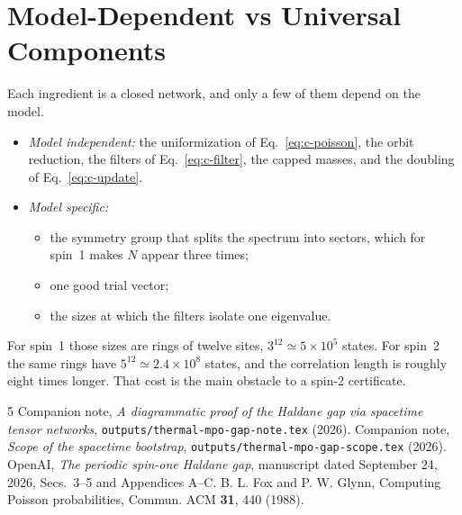 \documentclass[aps,prl,reprint,amsmath,amssymb,nofootinbib,raggedbottom]{revtex4-2}
\begin{document}
\section{Model-Dependent vs Universal Components}\label{app:c-general}
Each ingredient is a closed network, and only a few of them depend on the
model.
\begin{itemize}
\item \emph{Model independent:} the uniformization of Eq.~\eqref{eq:c-poisson},
the orbit reduction, the filters of Eq.~\eqref{eq:c-filter}, the capped
masses, and the doubling of Eq.~\eqref{eq:c-update}.
\item \emph{Model specific:}
 \begin{itemize}
 \item the symmetry group that splits the spectrum into sectors, which
 for spin~1 makes $N$ appear three times;
 \item one good trial vector;
 \item the sizes at which the filters isolate one eigenvalue.
 \end{itemize}
\end{itemize}
For spin~1 those sizes are rings of twelve sites, $3^{12}\simeq5\times10^5$
states. For spin~2 the same rings have $5^{12}\simeq2.4\times10^8$ states,
and the correlation length is roughly eight times longer. That cost is the
main obstacle to a spin-2 certificate.
\begin{thebibliography}{5}
Companion note, \emph{A diagrammatic proof of the Haldane gap via spacetime
tensor networks}, \texttt{outputs/thermal-mpo-gap-note.tex} (2026).
Companion note, \emph{Scope of the spacetime bootstrap},
\texttt{outputs/thermal-mpo-gap-scope.tex} (2026).
OpenAI, \emph{The periodic spin-one Haldane gap}, manuscript dated
September 24, 2026, Secs.~3--5 and Appendices A--C.
B. L. Fox and P. W. Glynn, Computing Poisson probabilities,
Commun. ACM \textbf{31}, 440 (1988).
\end{thebibliography}
\end{document}
